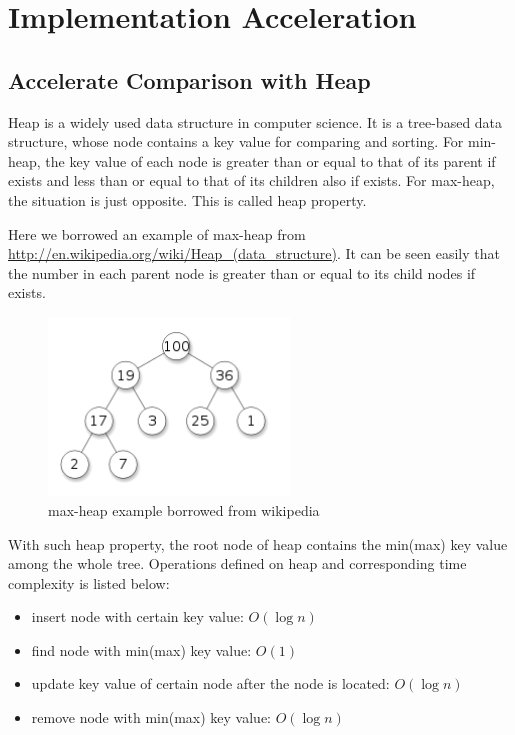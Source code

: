 \chapter{Implementation Acceleration}

\section{Accelerate Comparison with Heap}

Heap is a widely used data structure in computer science. It is a tree-based data structure, whose node contains a key value for comparing and sorting. For min-heap, the key value of each node is greater than or equal to that of its parent if exists and less than or equal to that of its children also if exists. For max-heap, the situation is just opposite. This is called heap property.

Here we borrowed an example of max-heap from \url{http://en.wikipedia.org/wiki/Heap_(data_structure)}. It can be seen easily that the number in each parent node is greater than or equal to its child nodes if exists.

\begin{figure}[ht]
\centering
\includegraphics[width=64mm]{heap.png}
\caption{max-heap example borrowed from wikipedia}
\end{figure}

With such heap property, the root node of heap contains the min(max) key value among the whole tree. Operations defined on heap and corresponding time complexity is listed below:

\begin{itemize}
\item insert node with certain key value: $O(\log n)$
\item find node with min(max) key value: $O(1)$
\item update key value of certain node after the node is located: $O(\log n)$
\item remove node with min(max) key value: $O(\log n)$
\end{itemize}

